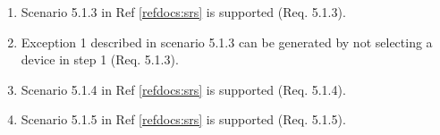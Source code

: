 \documentclass[a4paper]{article}
\newlength{\testlabellength}
\newenvironment{testlist}{\begin{enumerate}[label=\bfseries Instruction \thesubsection.\arabic* , labelindent=0pt, labelwidth=\testlabellength , leftmargin=2cm]}{\end{enumerate}}
\newenvironment{precondition}{
{\color{white}BLARG}\\ 
\textbf{Precondition}
\begin{itemize}[labelindent=0cm, labelwidth=2cm , leftmargin=1cm]
}
{\end{itemize}}
\newenvironment{instruction}{
\textbf{Instructions:}
\begin{enumerate}[label=\bfseries  \arabic*., labelindent=0cm, labelwidth=2cm , leftmargin=1cm]
}
{\end{enumerate}}
\newenvironment{postcondition}{
\textbf{Postcondition:}
\begin{itemize}[labelindent=0cm, labelwidth=2cm , leftmargin=1cm]
}
{\end{itemize}}
\begin{document}
\begin{appendices}
\begin{testlist}
	\item Scenario 5.1.3 in Ref \ref{refdocs:srs} is supported (Req. 5.1.3).

	\item Exception 1 described in scenario 5.1.3 can be generated by not selecting a device in step 1 (Req. 5.1.3). 

	\item Scenario 5.1.4 in Ref \ref{refdocs:srs} is supported (Req. 5.1.4).

	\item Scenario 5.1.5 in Ref \ref{refdocs:srs} is supported (Req. 5.1.5).


\end{testlist}
\end{appendices}
\end{document}
